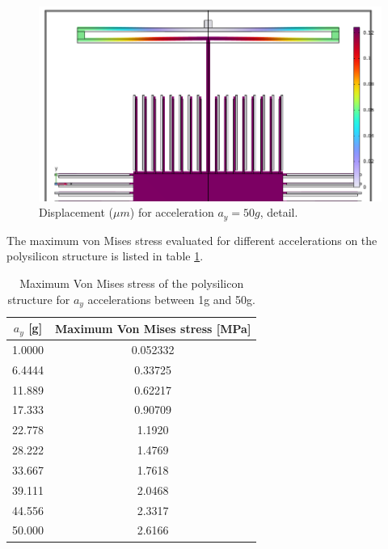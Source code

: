 \documentclass[lettersize,journal]{IEEEtran}
\begin{document}
    \begin{figure}[!h]
        \centering
        \includegraphics[width=1.0\linewidth]{displacement_ay_detail}
        \caption{Displacement (\(\mu m\)) for acceleration \(a_y=50g\), detail.}
        \label{fig:disp_ay_det}
    \end{figure}
    
    The maximum von Mises stress evaluated for different accelerations on the polysilicon structure is listed in table \ref{tab:max_y_stress}.
    
    \begin{table}[h]
        \caption{Maximum Von Mises stress of the polysilicon structure for \(a_y\) accelerations between 1g and 50g.}
        \renewcommand{\arraystretch}{1.5}
        \centering
        \begin{tabular}{|c|c|}
            \hline
            \textbf{\(a_y\) [g]} & \textbf{Maximum Von Mises stress [MPa]} \\ \hline
            1.0000       & 0.052332                 \\ \hline
            6.4444       & 0.33725                \\ \hline
            11.889       & 0.62217                \\ \hline
            17.333       & 0.90709                 \\ \hline
            22.778       & 1.1920                 \\ \hline
            28.222       & 1.4769                 \\ \hline
            33.667       & 1.7618                 \\ \hline
            39.111       & 2.0468                 \\ \hline
            44.556       & 2.3317                 \\ \hline
            50.000       & 2.6166                 \\ \hline
        \end{tabular}
        \label{tab:max_y_stress}
    \end{table}
    
\end{document}
